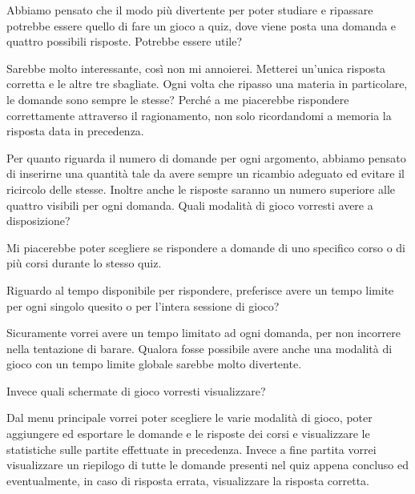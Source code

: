     
    \begin{QandA}
        \item Abbiamo pensato che il modo più divertente per poter studiare e ripassare potrebbe essere quello di fare un gioco a quiz, dove viene posta una domanda e quattro possibili risposte. Potrebbe essere utile?
            \begin{answered}
            Sarebbe molto interessante, così non mi annoierei. Metterei un'unica risposta corretta e le altre tre sbagliate. Ogni volta che ripasso una materia in particolare, le domande sono sempre le stesse? Perché a me piacerebbe rispondere correttamente attraverso il ragionamento, non solo ricordandomi a memoria la risposta data in precedenza.
            \end{answered}
        \item Per quanto riguarda il numero di domande per ogni argomento, abbiamo pensato di inserirne una quantità tale da avere sempre un ricambio adeguato ed evitare il ricircolo delle stesse. Inoltre anche le risposte saranno un numero superiore alle quattro visibili per ogni domanda.
        Quali modalità di gioco vorresti avere a disposizione?
            \begin{answered}
            Mi piacerebbe poter scegliere se rispondere a domande di uno specifico corso o di più corsi durante lo stesso quiz.
            \end{answered}
        \item Riguardo al tempo disponibile per rispondere, preferisce avere un tempo limite per ogni singolo quesito o per l'intera sessione di gioco?
            \begin{answered}
            Sicuramente vorrei avere un tempo limitato ad ogni domanda, per non incorrere nella tentazione di barare. Qualora fosse possibile avere anche una modalità di gioco con un tempo limite globale sarebbe molto divertente.
            \end{answered}
        \item Invece quali schermate di gioco vorresti visualizzare?
            \begin{answered}
            Dal menu principale vorrei poter scegliere le varie modalità di gioco, poter aggiungere ed esportare le domande e le risposte dei corsi e visualizzare le statistiche sulle partite effettuate in precedenza. Invece a fine partita vorrei visualizzare un riepilogo di tutte le domande presenti nel quiz appena concluso ed eventualmente, in caso di risposta errata, visualizzare la risposta corretta.
            \end{answered}
    \end{QandA}


